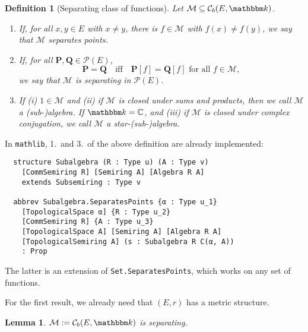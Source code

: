\documentclass{article}
\newtheorem{lemma}[proposition]{Lemma}
\newtheorem{definition}[proposition]{Definition}
\theoremstyle{definition}
\theoremstyle{step} \newtheorem{step}{Step}
\newcommand{\leanline}[1]{\texttt{#1}}%
\begin{document}
\begin{paracol}{2}
  \begin{definition}[Separating class of functions]
    \mbox{} Let $\mathcal M \subseteq \mathcal C_{b}(E,\mathbbm k)$.
    \begin{enumerate}
      \item If, for all $x,y\in E$ with $x\neq y$, there is
            $f\in\mathcal M$ with $f(x)\neq f(y)$, we say that $\mathcal M$
            separates points.
      \item
            If, for all $\mathbf P, \mathbf Q\in\mathcal P(E)$,
            $$ \mathbf P = \mathbf Q \quad \text{iff}\quad \mathbf P[f] =
              \mathbf Q[f] \text{ for all } f\in\mathcal M,$$ we say that
            $\mathcal M$ is separating in $\mathcal P(E)$.
      \item If (i) $1\in\mathcal M$ and (ii) if $\mathcal M$ is closed
            under sums and products, then we call $\mathcal M$ a
            (sub-)algebra.  If $\mathbbm k = \mathbb C$, and (iii) if
            $\mathcal M$ is closed under complex conjugation, we call
            $\mathcal M$ a star-(sub-)algebra.
    \end{enumerate}
  \end{definition}

  \switchcolumn
  In \leanline{mathlib}, 1.\ and 3.\ of the above definition are already
  implemented:

  \begin{verbatim}
  structure Subalgebra (R : Type u) (A : Type v) 
    [CommSemiring R] [Semiring A] [Algebra R A] 
    extends Subsemiring : Type v

  abbrev Subalgebra.SeparatesPoints {α : Type u_1} 
    [TopologicalSpace α] {R : Type u_2} 
    [CommSemiring R] {A : Type u_3} 
    [TopologicalSpace A] [Semiring A] [Algebra R A] 
    [TopologicalSemiring A] (s : Subalgebra R C(α, A))
    : Prop
\end{verbatim}

  The latter is an extension of \leanline{Set.SeparatesPoints}, which
  works on any set of functions.

  \switchcolumn*

  \noindent
  For the first result, we already need that $(E,r)$ has a metric
  structure.

  \begin{lemma}\label{l:unique}
    $\mathcal M := \mathcal C_b(E, \mathbbm k)$ is separating.
  \end{lemma}


\end{paracol}
\end{document}
